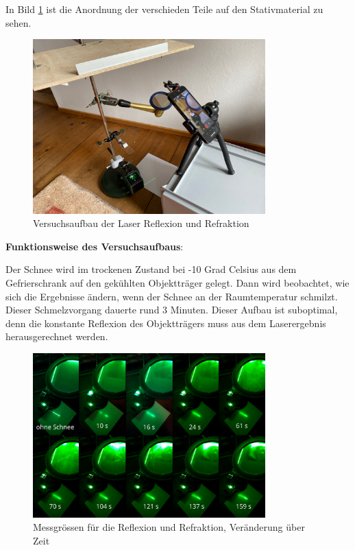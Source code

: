 In Bild \ref{fig:LaserAufbau} ist die Anordnung der verschieden Teile auf den Stativmaterial zu sehen.


\begin{figure}
    \centering
    \includegraphics[width=0.8\textwidth]{Bilder/signal-2024-03-10-112013_006.jpeg}
    \caption{Versuchsaufbau der Laser Reflexion und Refraktion}
    \label{fig:LaserAufbau}
\end{figure}


\textbf{Funktionsweise des Versuchsaufbaus}:

Der Schnee wird im trockenen Zustand bei -10 Grad Celsius aus dem Gefrierschrank auf den gekühlten Objektträger gelegt. Dann wird beobachtet, wie sich die Ergebnisse ändern, wenn der Schnee an der Raumtemperatur schmilzt. Dieser Schmelzvorgang dauerte rund 3 Minuten. Dieser Aufbau ist suboptimal, denn die konstante Reflexion des Objektträgers muss aus dem Laserergebnis herausgerechnet werden.


\begin{figure}[H]
    \centering
    \includegraphics[width=0.8\textwidth]{Bilder/Screenshotfrom2024-04-0413-27-28.png}
    \caption{Messgrössen für die Reflexion und Refraktion, Veränderung über Zeit}
    \label{fig:LaserRef}
\end{figure}



